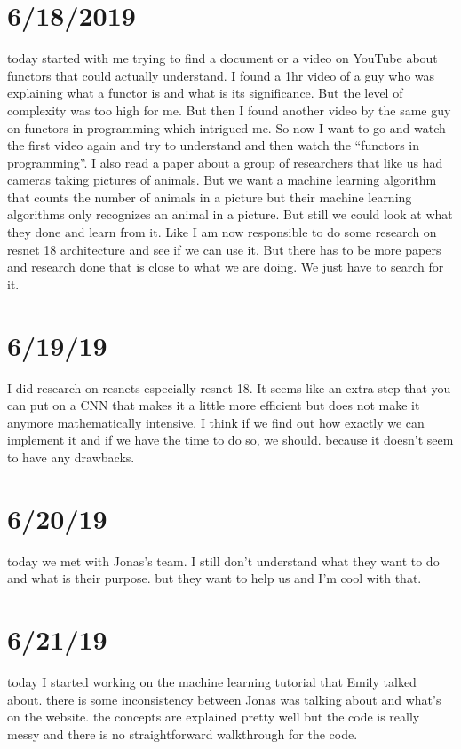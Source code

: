\documentclass{article}
\begin{document}
\section{6/18/2019}
today started with me trying to find a document or a video on YouTube about functors that could actually understand. I found a 1hr video of a guy who was explaining what a functor is and what is its significance. But the level of complexity was too high for me. But then I found another video by the same guy on functors in programming which intrigued me. So now I want to go and watch the first video again and try to understand and then watch the “functors in programming”.
I also read a paper about a group of researchers that like us had cameras taking pictures of animals. But we want a machine learning algorithm that counts the number of animals in a picture but their machine learning algorithms only recognizes an animal in a picture. But still we could look at what they done and learn from it. Like I am now responsible to do some research on resnet 18 architecture and see if we can use it.
But there has to be more papers and research done that is close to what we are doing. We just have to search for it.

\section{6/19/19}
I did research on resnets especially resnet 18. It seems like an extra step that you can put on a CNN that makes it a little more efficient but does not make it anymore mathematically intensive. I think if we find out how exactly we can implement it and if we have the time to do so, we should. because it doesn't seem to have any drawbacks.

\section{6/20/19}
today we met with Jonas's team. I still don't understand what they want to do and what is their purpose. but they want to help us and I’m cool with that.

\section{6/21/19}
today I started working on the machine learning tutorial that Emily talked about. there is some inconsistency between Jonas was talking about and what’s on the website. the concepts are explained pretty well but the code is really messy and there is no straightforward walkthrough for the code.
\end{document}
